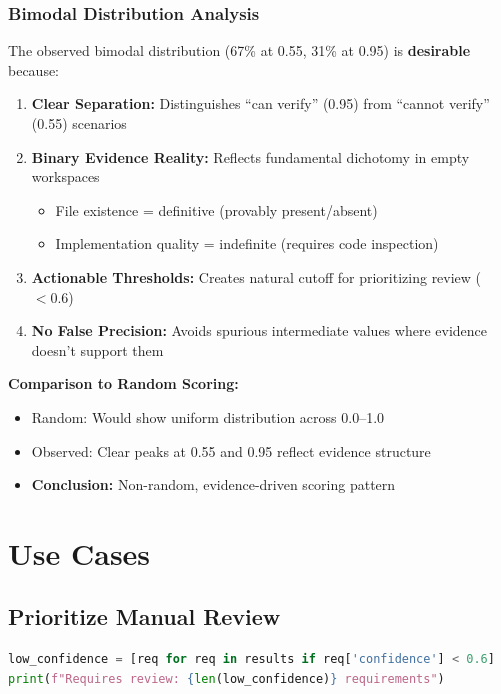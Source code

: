 \documentclass[11pt,a4paper]{article}
\begin{document}
\subsubsection{Bimodal Distribution Analysis}

The observed bimodal distribution (67\% at 0.55, 31\% at 0.95) is \textbf{desirable} because:

\begin{enumerate}[leftmargin=*]
    \item \textbf{Clear Separation:} Distinguishes ``can verify'' (0.95) from ``cannot verify'' (0.55) scenarios
    \item \textbf{Binary Evidence Reality:} Reflects fundamental dichotomy in empty workspaces
    \begin{itemize}
        \item File existence = definitive (provably present/absent)
        \item Implementation quality = indefinite (requires code inspection)
    \end{itemize}
    \item \textbf{Actionable Thresholds:} Creates natural cutoff for prioritizing review ($< 0.6$)
    \item \textbf{No False Precision:} Avoids spurious intermediate values where evidence doesn't support them
\end{enumerate}

\textbf{Comparison to Random Scoring:}
\begin{itemize}[leftmargin=*]
    \item Random: Would show uniform distribution across 0.0--1.0
    \item Observed: Clear peaks at 0.55 and 0.95 reflect evidence structure
    \item \textbf{Conclusion:} Non-random, evidence-driven scoring pattern
\end{itemize}

\section{Use Cases}

\subsection{Prioritize Manual Review}

\begin{lstlisting}[language=Python, caption={Filter Low Confidence Judgments}]
low_confidence = [req for req in results if req['confidence'] < 0.6]
print(f"Requires review: {len(low_confidence)} requirements")
\end{lstlisting}
\end{document}

